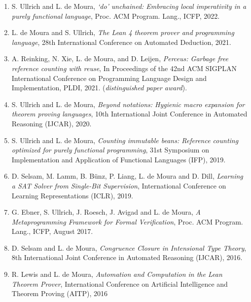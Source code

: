 \documentclass{article}
\begin{document}
\begin{enumerate}

\item S. Ullrich and L. de Moura,
      {\em ‘do’ unchained: Embracing local imperativity in a purely functional language},
      Proc. ACM Program. Lang., ICFP, 2022.

\item L. de Moura and S. Ullrich,
      {\em The Lean 4 theorem prover and programming language},
      28th International Conference on Automated Deduction, 2021.

\item A. Reinking, N. Xie, L. de Moura, and D. Leijen,
      {\em Perceus: Garbage free reference counting with reuse},
      In Proceedings of the 42nd ACM SIGPLAN International Conference on Programming Language Design and Implementation, PLDI, 2021. ({\em distinguished paper award}).

\item S. Ullrich and L. de Moura,
      {\em Beyond notations: Hygienic macro expansion for theorem proving languages},
      10th International Joint Conference in Automated Reasoning (IJCAR), 2020.

\item S. Ullrich and L. de Moura,
      {\em Counting immutable beans: Reference counting optimized for purely functional programming},
      31st Symposium on Implementation and Application of Functional Languages (IFP), 2019.

\item D. Selsam, M. Lamm, B. Bünz, P. Liang, L. de Moura and D. Dill,
      {\em Learning a SAT Solver from Single-Bit Supervision},
      International Conference on Learning Representations (ICLR), 2019.

\item G. Ebner, S. Ullrich, J. Roesch, J. Avigad and L. de Moura,
      {\em A Metaprogramming Framework for Formal Verification},
      Proc. ACM Program. Lang., ICFP, August 2017.

\item D. Selsam and L. de Moura,
      {\em Congruence Closure in Intensional Type Theory},
8th International Joint Conference in Automated Reasoning (IJCAR), 2016.

\item R. Lewis and L. de Moura,
      {\em Automation and Computation in the Lean Theorem Prover},
      International Conference on Artificial Intelligence and Theorem Proving (AITP), 2016


\end{enumerate}
\end{document}
